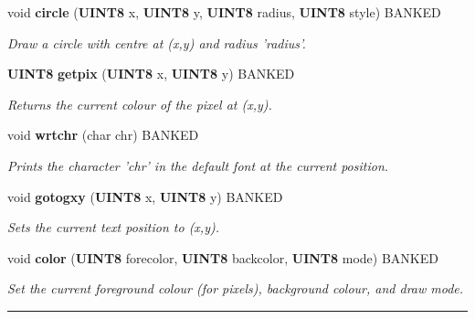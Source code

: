 \begin{CompactItemize}
\item 
void {\bf circle} ({\bf UINT8} x, {\bf UINT8} y, {\bf UINT8} radius, {\bf UINT8} style) BANKED
\begin{CompactList}\small\item\em Draw a circle with centre at (x,y) and radius 'radius'.\item\end{CompactList}

\item 
\label{drawing.h_a25}
{\bf UINT8} {\bf getpix} ({\bf UINT8} x, {\bf UINT8} y) BANKED
\begin{CompactList}\small\item\em Returns the current colour of the pixel at (x,y).\item\end{CompactList}

\item 
\label{drawing.h_a26}
void {\bf wrtchr} (char chr) BANKED
\begin{CompactList}\small\item\em Prints the character 'chr' in the default font at the current position.\item\end{CompactList}

\item 
void {\bf gotogxy} ({\bf UINT8} x, {\bf UINT8} y) BANKED
\begin{CompactList}\small\item\em Sets the current text position to (x,y).\item\end{CompactList}

\item 
\label{drawing.h_a28}
void {\bf color} ({\bf UINT8} forecolor, {\bf UINT8} backcolor, {\bf UINT8} mode) BANKED
\begin{CompactList}\small\item\em Set the current foreground colour (for pixels), background colour, and draw mode.\item\end{CompactList}

\end{CompactItemize}
\vspace{0.4cm}\hrule\vspace{0.2cm}
